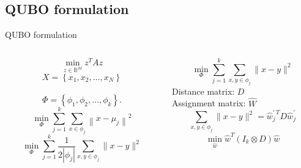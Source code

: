 
\subsection{QUBO formulation}
	\begin{frame}{QUBO formulation}
		\begin{columns}
			\begin{column}{0.5\textwidth}
				$$\min _{z \in \mathbb{B}^{M}} z^{T} A z$$
				\pause
				$$X=\left\{x_{1}, x_{2}, \ldots, x_{N}\right\}$$\\$$\Phi=\left\{\phi_{1}, \phi_{2}, \ldots, \phi_{k}\right\} .$$
				\pause
				$$\min _{\Phi} \sum_{j=1}^{k} \sum_{x \in \phi_{j}}\left\|x-\mu_{j}\right\|^{2}$$
				\pause
				$$\min _{\Phi} \sum_{j=1}^{k} \frac{1}{2\left|\phi_{j}\right|} \sum_{x, y \in \phi_{j}}\|x-y\|^{2}$$
				\pause

			\end{column}
			\begin{column}{0.5\textwidth}  
				$$\min _{\Phi} \sum_{j=1}^{k} \sum_{x, y \in \phi_{j}}\|x-y\|^{2}$$
				\pause
				Distance matrix: $D$ \\Assignment matrix: $\hat W$
				\pause
				$$\sum_{x, y \in \phi_{j}}\|x-y\|^{2}=\hat{w}^{\prime \: T}_{j} D \hat{w}_{j}^{\prime}$$
				\pause
				$$\min _{\hat{w}} \hat{w}^{T}\left(I_{k} \otimes D\right) \hat{w}$$
			\end{column}
		\end{columns}
	\end{frame}

